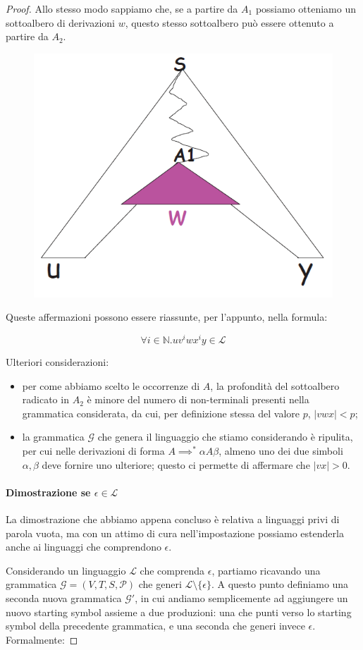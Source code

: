 \documentclass[class=book, crop=false, oneside, 12pt]{standalone}
\begin{document}
\begin{proof}
  Allo stesso modo sappiamo che, se a partire da \(A_1\) possiamo otteniamo un sottoalbero di derivazioni \(w\), questo stesso sottoalbero può essere ottenuto a partire da \(A_2\).

  \begin{figure}
    \centering
    \includegraphics[width=.25\textwidth,keepaspectratio]{pl-proof_5}
  \end{figure}

  Queste affermazioni possono essere riassunte, per l'appunto, nella formula:

  \begin{equation*}
    \forall i \in \mathbb{N}.uv^iwx^iy \in \mathcal{L}
  \end{equation*}

  Ulteriori considerazioni:
   \begin{itemize}
     \item per come abbiamo scelto le occorrenze di \(A\), la profondità del sottoalbero radicato in \(A_2\) è minore del numero di non-terminali presenti nella grammatica considerata, da cui, per definizione stessa del valore \(p\), \(|vwx| < p\);
     \item la grammatica \(\mathcal{G}\) che genera il linguaggio che stiamo considerando è ripulita, per cui nelle derivazioni di forma \(A \implies^* \alpha A \beta\), almeno uno dei due simboli \(\alpha, \beta\) deve fornire uno ulteriore; questo ci permette di affermare che \(|vx| > 0\).
   \end{itemize}

   \paragraph{Dimostrazione se \(\epsilon \in \mathcal{L}\)}
   La dimostrazione che abbiamo appena concluso è relativa a linguaggi privi di parola vuota, ma con un attimo di cura nell'impostazione possiamo estenderla anche ai linguaggi che comprendono \(\epsilon\).

   Considerando un linguaggio \(\mathcal{L}\) che comprenda \(\epsilon\), partiamo ricavando una grammatica \(\mathcal{G} = (V, T, S, \mathcal{P})\) che generi \(\mathcal{L} \setminus \{\epsilon\}\). A questo punto definiamo una seconda nuova grammatica \(\mathcal{G}'\), in cui andiamo semplicemente ad aggiungere un nuovo starting symbol assieme a due produzioni: una che punti verso lo starting symbol della precedente grammatica, e una seconda che generi invece \(\epsilon\). Formalmente:


\end{proof}
\end{document}
